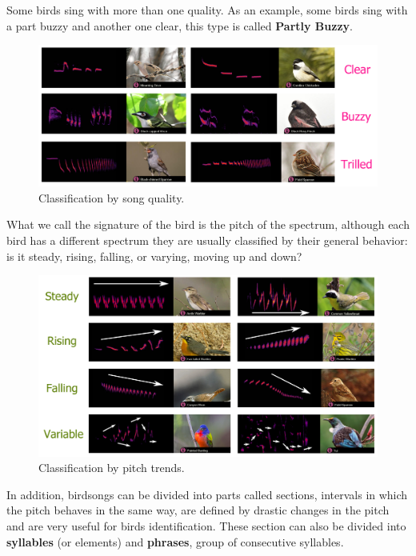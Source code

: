 Some birds sing with more than one quality. As an example, some birds sing with a part buzzy and another one clear, this type is called \textbf{Partly Buzzy}.

\begin{figure}[H]
    \centering
    \includegraphics[scale=1.2]{Images/quality.png}
    \caption{Classification by song quality. }
    \label{fig:quality}
\end{figure}

What we call the signature of the bird is the pitch of the spectrum, although each bird has a different spectrum they are usually classified by their general behavior: is it steady, rising, falling, or varying, moving up and down? 

\begin{figure}[H]
    \centering
    \includegraphics[scale=1.2]{Images/pitch_trend.png}
    \caption{Classification by pitch trends.}
    \label{fig:quality}
\end{figure}

In addition, birdsongs can be divided into parts called sections, intervals in which the pitch behaves in the same way, are defined by drastic changes in the pitch and are very useful for birds identification. These section can also be divided into \textbf{syllables} (or elements) and \textbf{phrases}, group of consecutive syllables. 



